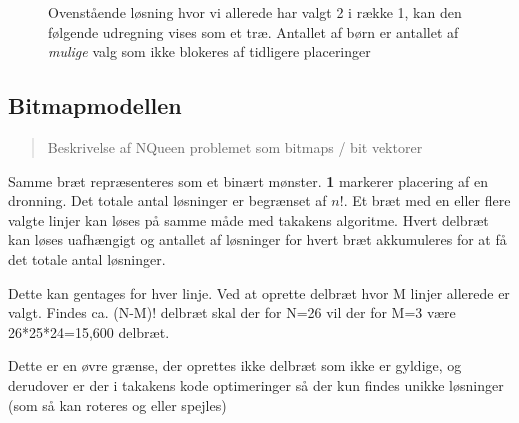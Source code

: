 \documentclass[final,a4paper,10pt]{article}
\begin{document}


\begin{figure}[!h]

\caption{Ovenstående løsning hvor vi allerede har valgt 2 i række 1, kan den følgende udregning vises som et træ.
Antallet af børn er antallet af \textit{mulige} valg som ikke blokeres af tidligere placeringer}
	
\end{figure}



\subsection{Bitmapmodellen}\label{bitmapmodellen}
\begin{verse}
	Beskrivelse af NQueen problemet som bitmaps / bit vektorer
\end{verse}

Samme bræt repræsenteres som et binært mønster. \textbf{1} markerer placering af en dronning. Det totale antal løsninger er begrænset af $n!$. 
Et bræt med en eller flere valgte linjer kan løses på samme måde med takakens algoritme. Hvert delbræt kan løses uafhængigt og antallet af løsninger for hvert bræt akkumuleres for at få det totale antal løsninger.

Dette kan gentages for hver linje. Ved at oprette delbræt hvor M linjer allerede er valgt. Findes ca. (N-M)! delbræt skal der for N=26 vil der for M=3 være 26*25*24=15,600 delbræt.

Dette er en øvre grænse, der oprettes ikke delbræt som ikke er gyldige, og derudover er der i takakens kode optimeringer så der kun findes unikke løsninger (som så kan roteres og eller spejles)
\end{document}
